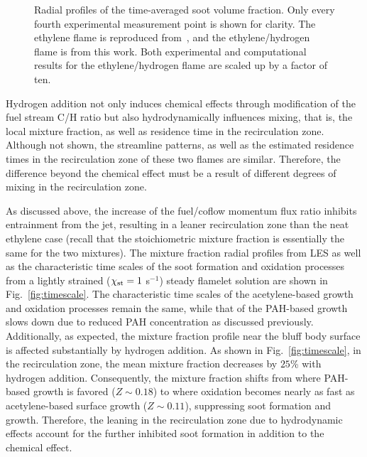 \documentclass{essci}
\begin{document}
\begin{figure}[t]
  \centering
  \scriptsize
  \vspace{-0.20in}
  \resizebox{0.49\textwidth}{!}{}
  \resizebox{0.49\textwidth}{!}{}
  \vspace{-0.2in}
  \normalsize
  \caption{Radial profiles of the time-averaged soot volume fraction.  Only every fourth experimental measurement point is shown for clarity.  The ethylene flame is reproduced from~\cite{mueller13}, and the ethylene/hydrogen flame is from this work.  Both experimental and computational results for the ethylene/hydrogen flame are scaled up by a factor of ten.}
  \label{fig:fv_radial}
\end{figure}

Hydrogen addition not only induces chemical effects through modification of the fuel stream C/H ratio but also hydrodynamically influences mixing, that is, the local mixture fraction, as well as residence time in the recirculation zone.  Although not shown, the streamline patterns, as well as the estimated residence times in the recirculation zone of these two flames are similar.  Therefore, the difference beyond the chemical effect must be a result of different degrees of mixing in the recirculation zone.

As discussed above, the increase of the fuel/coflow momentum flux ratio inhibits entrainment from the jet, resulting in a leaner recirculation zone than the neat ethylene case (recall that the stoichiometric mixture fraction is essentially the same for the two mixtures).  The mixture fraction radial profiles from LES as well as the characteristic time scales of the soot formation and oxidation processes from a lightly strained ($\chi_{\rm st} = 1$ s$^{-1}$) steady flamelet solution are shown in Fig.~\ref{fig:timescale}.  The characteristic time scales of the acetylene-based growth and oxidation processes remain the same, while that of the PAH-based growth slows down due to reduced PAH concentration as discussed previously.  Additionally, as expected, the mixture fraction profile near the bluff body surface is affected substantially by hydrogen addition.  As shown in Fig.~\ref{fig:timescale}, in the recirculation zone, the mean mixture fraction decreases by $25$\% with hydrogen addition.  Consequently, the mixture fraction shifts from where PAH-based growth is favored ($Z \sim 0.18$) to where oxidation becomes nearly as fast as acetylene-based surface growth ($Z \sim 0.11$), suppressing soot formation and growth.  Therefore, the leaning in the recirculation zone due to hydrodynamic effects account for the further inhibited soot formation in addition to the chemical effect.
\end{document}
